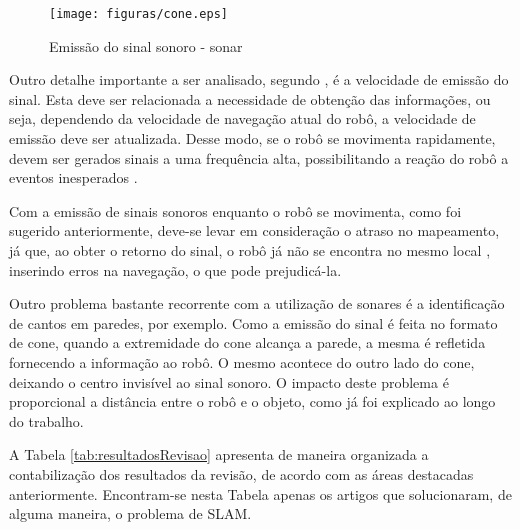 			\begin{figure}[H]
				\centering
				\texttt{[image: figuras/cone.eps]}
				\caption[Emissão do sinal sonoro - sonar]{Emissão do sinal sonoro - sonar}
				\label{img:cone}
			\end{figure}

			Outro detalhe importante a ser analisado, segundo \cite{agenteExploratorioKalman}, é a velocidade de emissão do sinal. Esta deve ser relacionada a necessidade de obtenção das informações, ou seja, dependendo da velocidade de navegação atual do robô, a velocidade de emissão deve ser atualizada. Desse modo, se o robô se movimenta rapidamente, devem ser gerados sinais a uma frequência alta, possibilitando a reação do robô a eventos inesperados \cite{agenteExploratorioKalman}.

			Com a emissão de sinais sonoros enquanto o robô se movimenta, como foi sugerido anteriormente, deve-se levar em consideração o atraso no mapeamento, já que, ao obter o retorno do sinal, o robô já não se encontra no mesmo local \cite{agenteExploratorioKalman}, inserindo erros na navegação, o que pode prejudicá-la.

			Outro problema bastante recorrente com a utilização de sonares é a identificação de cantos em paredes, por exemplo. Como a emissão do sinal é feita no formato de cone, quando a extremidade do cone alcança a parede, a mesma é refletida fornecendo a informação ao robô. O mesmo acontece do outro lado do cone, deixando o centro invisível ao sinal sonoro. O impacto deste problema é proporcional a distância entre o robô e o objeto, como já foi explicado ao longo do trabalho.


	A Tabela \ref{tab:resultadosRevisao} apresenta de maneira organizada a contabilização dos resultados da revisão, de acordo com as áreas destacadas anteriormente. Encontram-se nesta Tabela apenas os artigos que solucionaram, de alguma maneira, o problema de SLAM.

